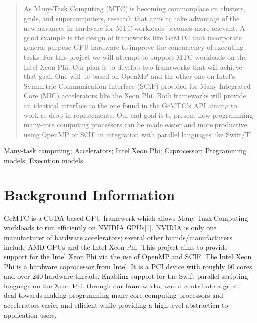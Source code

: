 \documentclass[10pt, conference, compsocconf]{IEEEtran}
\begin{document}
\begin{abstract}
As Many-Task Computing (MTC) is becoming commonplace on clusters, grids, and supercomputers, research that aims to take advantage of the new advances in hardware for MTC workloads becomes more relevant. A good example is the design of frameworks like GeMTC that incorporate general purpose GPU hardware to improve the concurrency of executing tasks. For this project we will attempt to support MTC workloads on the Intel Xeon Phi. Our plan is to develop two frameworks that will achieve that goal. One will be based on OpenMP and the other one on Intel’s Symmetric Communication Interface (SCIF) provided for Many-Integrated Core (MIC) accelerators like the Xeon Phi. Both frameworks will provide an identical interface to the one found in the GeMTC’s API aiming to work as drop-in replacements. Our end-goal is to present how programming many-core computing processors can be made easier and more productive using OpenMP or SCIF in integration with parallel languages like Swift/T.

\end{abstract}

\begin{IEEEkeywords}
Many-task computing; Accelerators; Intel Xeon Phi; Coprocessor; Programming models; Execution models.

\end{IEEEkeywords}


%
\IEEEpeerreviewmaketitle



\section{Background Information}
GeMTC is a CUDA based GPU framework which allows Many-Task Computing workloads to run efficiently on NVIDIA GPUs[1]. NVIDIA is only one manufacturer of hardware accelerators; several other brands/manufacturers include AMD GPUs and the Intel Xeon Phi. This project aims to provide support for the Intel Xeon Phi via the use of OpenMP and SCIF. The Intel Xeon Phi is a hardware coprocessor from Intel. It is a PCI device with roughly 60 cores and over 240 hardware threads. Enabling support for the Swift parallel scripting language on the Xeon Phi, through our frameworks, would contribute a great deal towards making programming many-core computing processors and accelerators easier and efficient while providing a high-level abstraction to application users.
\end{document}
